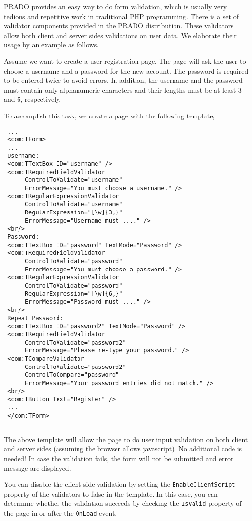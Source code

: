 \documentclass{book}
\begin{document}
PRADO provides an easy way to do form validation, which is usually
very tedious and repetitive work in traditional PHP programming.
There is a set of validator components provided in the PRADO
distribution. These validators allow both client and server sides
validations on user data. We elaborate their usage by an example
as follows.


Assume we want to create a user registration page. The page will
ask the user to choose a username and a password for the new
account. The password is required to be entered twice to avoid
errors. In addition, the username and the password must contain
only alphanumeric characters and their lengths must be at least 3
and 6, respectively.


To accomplish this task, we create a page with the following
template,
\begin{verbatim}
 ...
 <com:TForm>
 ...
 Username:
 <com:TTextBox ID="username" />
 <com:TRequiredFieldValidator
      ControlToValidate="username"
      ErrorMessage="You must choose a username." />
 <com:TRegularExpressionValidator
      ControlToValidate="username"
      RegularExpression="[\w]{3,}"
      ErrorMessage="Username must ...." />
 <br/>
 Password:
 <com:TTextBox ID="password" TextMode="Password" />
 <com:TRequiredFieldValidator
      ControlToValidate="password"
      ErrorMessage="You must choose a password." />
 <com:TRegularExpressionValidator
      ControlToValidate="password"
      RegularExpression="[\w]{6,}"
      ErrorMessage="Password must ...." />
 <br/>
 Repeat Password:
 <com:TTextBox ID="password2" TextMode="Password" />
 <com:TRequiredFieldValidator
      ControlToValidate="password2"
      ErrorMessage="Please re-type your password." />
 <com:TCompareValidator
      ControlToValidate="password2"
      ControlToCompare="password"
      ErrorMessage="Your password entries did not match." />
 <br/>
 <com:TButton Text="Register" />
 ...
 </com:TForm>
 ...
\end{verbatim}


The above template will allow the page to do user input validation
on both client and server sides (assuming the browser allows
javascript). No additional code is needed! In case the validation
fails, the form will not be submitted and error message are
displayed.


You can disable the client side validation by setting the
\verb|EnableClientScript| property of the validators to false in
the template. In this case, you can determine whether the
validation succeeds by checking the \verb|IsValid| property of the
page in or after the \verb|OnLoad| event.
\end{document}
